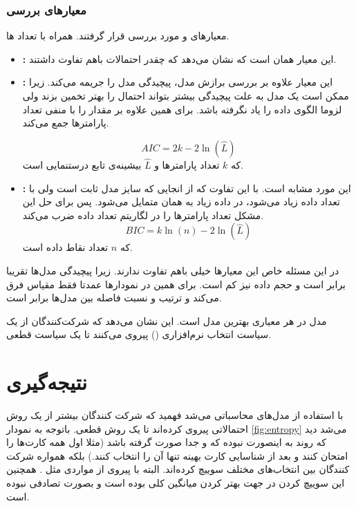 \documentclass[12pt]{article}
\begin{document}
	\subsubsection*{معیارهای بررسی}
	معیارهای 
	و
	مورد بررسی قرار گرفتند. همراه با تعداد 
	ها.
	\begin{itemize}
		\item 
		\textbf{:}
		این معیار همان 
		است که نشان می‌دهد که چقدر احتمالات باهم تفاوت داشتند.
		
		\item 
		\textbf{:}
این معیار علاوه بر بررسی برازش مدل، پیچیدگی مدل را جریمه می‌کند. زیرا ممکن است یک مدل به علت پیچیدگی بیشتر بتواند احتمال را بهتر تخمین بزند ولی لزوما الگوی داده را یاد نگرفته باشد. برای همین علاوه بر 
مقدار را با منفی تعداد پارامترها جمع می‌کند. 



	\begin{equation}
		AIC = 2k - 2\ln(\hat{L})
	\end{equation}
	که $k$ تعداد پارامترها و $\hat{L}$ بیشینه‌ی تابع درستنمایی است.
	
	\item 
	\textbf{:}
	این مورد مشابه 
	است. با این تفاوت که از انجایی که سایز مدل ثابت است ولی 
	با تعداد داده زیاد می‌شود، در داده زیاد 
	به همان 
	متمایل می‌شود. پس برای حل این مشکل تعداد پارامترها را در لگاریتم تعداد داده ضرب می‌کند. 
	\begin{equation}
		BIC = k\ln(n) - 2\ln(\hat{L})
	\end{equation}
	که $n$ تعداد نقاط داده است.
		\end{itemize}
	
	در این مسئله خاص این معیارها خیلی باهم تفاوت ندارند. زیرا پیچیدگی مدل‌ها تقریبا برابر است و حجم داده نیز کم است. برای همین در نمودارها عمدتا فقط مقیاس فرق می‌کند و ترتیب و نسبت فاصله بین مدل‌ها برابر است. 
	
	مدل  در هر معیاری بهترین مدل است. این نشان می‌دهد که شرکت‌کنندگان از یک سیاست انتخاب نرم‌افزاری () پیروی می‌کنند تا یک سیاست قطعی.
	

	\section*{نتیجه‌گیری}
	با استفاده از مدل‌های محاسباتی می‌شد فهمید که شرکت کنندگان بیشتر از یک روش احتمالاتی پیروی کرده‌اند تا یک روش قطعی. باتوجه به نمودار 
	\ref{fig:entropy}
	می‌شد دید که روند به اینصورت نبوده که 
	و
	جدا صورت گرفته باشد (مثلا اول همه کارت‌ها را امتحان کنند و بعد از شناسایی کارت بهینه تنها آن را انتخاب کنند.) بلکه همواره شرکت کنندگان بین انتخاب‌های مختلف سوییچ کرده‌اند. البته با پیروی از مواردی مثل 
	. همچنین این سوییچ کردن در جهت بهتر کردن میانگین کلی بوده است و بصورت تصادفی نبوده است. 
	
	
	\begin{latin}
		\printbibliography[heading=none]
	\end{latin}
\end{document}
